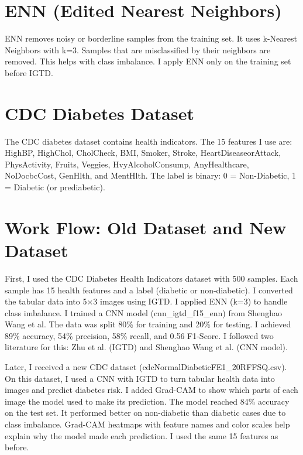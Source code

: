 \documentclass[12pt]{dalthesis}
\begin{document}
\section{ENN (Edited Nearest Neighbors)}

ENN removes noisy or borderline samples from the training set. It uses k-Nearest Neighbors with k=3. Samples that are misclassified by their neighbors are removed. This helps with class imbalance. I apply ENN only on the training set before IGTD.

\section{CDC Diabetes Dataset}

The CDC diabetes dataset contains health indicators. The 15 features I use are: HighBP, HighChol, CholCheck, BMI, Smoker, Stroke, HeartDiseaseorAttack, PhysActivity, Fruits, Veggies, HvyAlcoholConsump, AnyHealthcare, NoDocbcCost, GenHlth, and MentHlth. The label is binary: 0 = Non-Diabetic, 1 = Diabetic (or prediabetic).

\section{Work Flow: Old Dataset and New Dataset}

First, I used the CDC Diabetes Health Indicators dataset with 500 samples. Each sample has 15 health features and a label (diabetic or non-diabetic). I converted the tabular data into 5$\times$3 images using IGTD. I applied ENN (k=3) to handle class imbalance. I trained a CNN model (cnn\_igtd\_f15\_enn) from Shenghao Wang et al. The data was split 80\% for training and 20\% for testing. I achieved 89\% accuracy, 54\% precision, 58\% recall, and 0.56 F1-Score. I followed two literature for this: Zhu et al. (IGTD) and Shenghao Wang et al. (CNN model).

Later, I received a new CDC dataset (cdcNormalDiabeticFE1\_20RFFSQ.csv). On this dataset, I used a CNN with IGTD to turn tabular health data into images and predict diabetes risk. I added Grad-CAM to show which parts of each image the model used to make its prediction. The model reached 84\% accuracy on the test set. It performed better on non-diabetic than diabetic cases due to class imbalance. Grad-CAM heatmaps with feature names and color scales help explain why the model made each prediction. I used the same 15 features as before.

\end{document}
